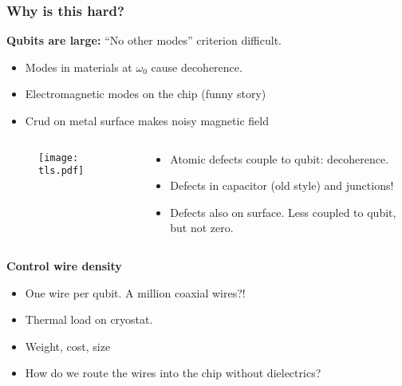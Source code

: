 \begin{frame}
\frametitle{Why is this hard?}
\textbf{Qubits are large:} ``No other modes'' criterion difficult.
\begin{itemize}
    \item Modes in materials at $\omega_0$ cause decoherence.
    \item Electromagnetic modes on the chip (funny story)
    \item Crud on metal surface makes noisy magnetic field
\end{itemize}
\pause
\begin{columns}
  \begin{column}{0.4\textwidth}
    \begin{figure}
      \texttt{[image: tls.pdf]}
    \end{figure}
  \end{column}
  \begin{column}{0.6\textwidth}
    \begin{itemize}
        \item Atomic defects couple to qubit: decoherence. 
        \item Defects in capacitor (old style) and junctions!
        \item Defects also on surface. Less coupled to qubit, but not zero.
    \end{itemize}
  \end{column}
\end{columns}
\pause
\textbf{Control wire density}
\begin{itemize}
    \item One wire per qubit. A million coaxial wires?!
    \item Thermal load on cryostat.
    \item Weight, cost, size
    \item How do we route the wires into the chip without dielectrics?
\end{itemize}
\end{frame}
